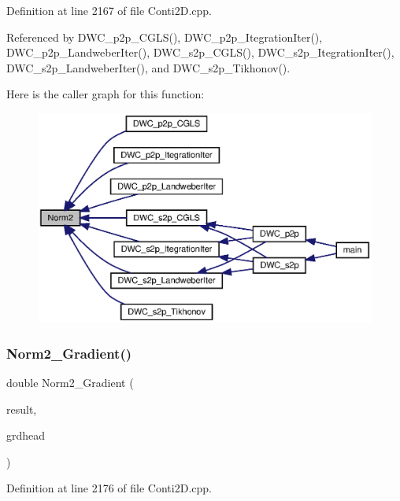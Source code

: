 Definition at line 2167 of file Conti2\+D.\+cpp.



Referenced by D\+W\+C\+\_\+p2p\+\_\+\+C\+G\+L\+S(), D\+W\+C\+\_\+p2p\+\_\+\+Itegration\+Iter(), D\+W\+C\+\_\+p2p\+\_\+\+Landweber\+Iter(), D\+W\+C\+\_\+s2p\+\_\+\+C\+G\+L\+S(), D\+W\+C\+\_\+s2p\+\_\+\+Itegration\+Iter(), D\+W\+C\+\_\+s2p\+\_\+\+Landweber\+Iter(), and D\+W\+C\+\_\+s2p\+\_\+\+Tikhonov().

Here is the caller graph for this function\+:\nopagebreak
\begin{figure}[H]
\begin{center}
\leavevmode
\includegraphics[width=350pt]{Conti2D_8h_a98827c14ed7072c96834f20205c7a916_a98827c14ed7072c96834f20205c7a916_icgraph}
\end{center}
\end{figure}
\mbox{\label{Conti2D_8h_a43fc3af75243a047d61aadea31c0fa9c_a43fc3af75243a047d61aadea31c0fa9c}} 
\subsubsection{Norm2\+\_\+\+Gradient()}
{\footnotesize\ttfamily double Norm2\+\_\+\+Gradient (\begin{DoxyParamCaption}\item[{double $\ast$}]{result,  }\item[{\textbf{ Grd\+Head}}]{grdhead }\end{DoxyParamCaption})}



Definition at line 2176 of file Conti2\+D.\+cpp.



